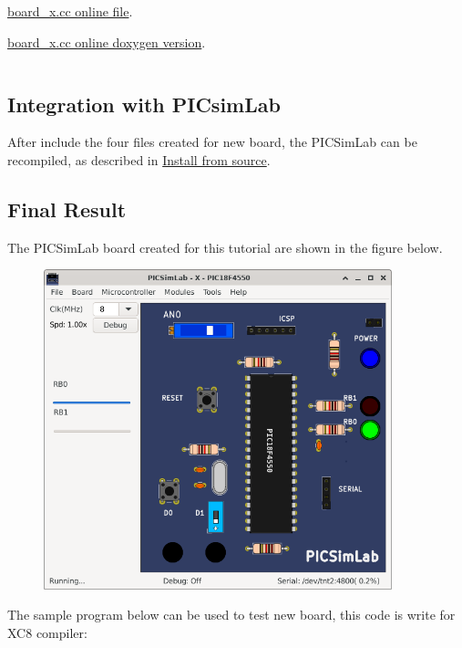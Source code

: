 \href{https://github.com/lcgamboa/picsimlab/blob/master/src/boards/board_x.cc}{ board\_x.cc online file}.

\href{https://lcgamboa.github.io/picsimlab_docs/devel/html/index.html#bcode}{ board\_x.cc online doxygen version}.

\inputminted[baselinestretch=1.2,fontsize=\footnotesize,linenos]{c++}{files/board_x.cc}


\subsection{Integration with PICsimLab}


After include the four files created for new board, the PICSimLab can be recompiled,
as described in \hyperlink{def:isource}{Install from source}.


\subsection{Final Result}

The PICSimLab board created for this tutorial are shown in the figure below.
\begin{figure}[H]
\center
\includegraphics[width=0.9\textwidth]{img/hb/final.png} 
\end{figure} 

The sample program below can be used to test new board, this code is write for XC8 compiler:
\inputminted[baselinestretch=1.2,fontsize=\footnotesize,linenos]{c}{sample/board_x.c}

